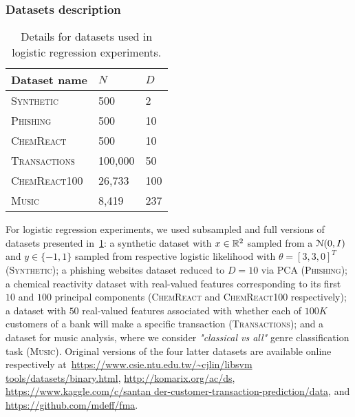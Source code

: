 \subsubsection{Datasets description}
\label{app:logreg_data_details}

\begin{table}[!htp]
	\begin{center}
		\begin{tabular}{|l|l|l|}
			\hline
			\textbf{Dataset name}       & $N$      & $D$   \\ \hline
			\textsc{Synthetic}  & 500    & 2   \\ \hline
			\textsc{Phishing}   & 500    & 10  \\ \hline
			\textsc{ChemReact}        & 500    & 10  \\ \hline
			\textsc{Transactions}  & 100,000   & 50   \\ \hline
			\textsc{ChemReact100}    & 26,733 & 100 \\ \hline
			\textsc{Music}      & 8,419    & 237 \\ \hline
		\end{tabular}
	\end{center}
	\caption{Details for datasets used in logistic regression experiments.}
	\label{table:datasets_details}
\end{table}

For logistic regression experiments, we used subsampled and full versions of datasets presented in~\cref{table:datasets_details}: a synthetic dataset with $ x\in \mathbb{R}^2 $ sampled \iid from a $\mathcal{N}{(0, I)}$ and $ y\in\{-1,1\} $ sampled from respective logistic likelihood with $ \theta =[3, 3, 0]^T$ (\textsc{Synthetic}); a phishing websites dataset reduced to $ D=10 $ via PCA (\textsc{Phishing}); a chemical reactivity dataset with  real-valued features corresponding to its first $ 10 $ and $ 100 $ principal components (\textsc{ChemReact} and \textsc{ChemReact100} respectively); a dataset with $ 50 $ real-valued features associated with whether each of $ 100K $ customers of a bank will make a specific transaction (\textsc{Transactions}); and a dataset for music analysis, where we consider \emph{"classical vs all"} genre classification task (\textsc{Music}). Original versions of the four latter datasets are available online respectively at~\href{https://www.csie.ntu.edu.tw/~cjlin/libsvmtools/datasets/binary.html}{https://www.csie.ntu.edu.tw/\~{}cjlin/libsvm tools/datasets/binary.html},  \href{http://komarix.org/ac/ds/}{http://komarix.org/ac/ds},  \href{https://www.kaggle.com/c/santander-customer-transaction-prediction/data}{https://www.kaggle.com/c/santan der-customer-transaction-prediction/data}, and \href{https://github.com/mdeff/fma}{https://github.com/mdeff/fma}. 



